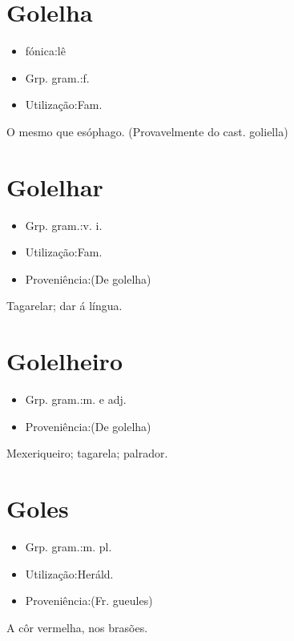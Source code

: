 \section{Golelha}
\begin{itemize}
\item {fónica:lê}
\end{itemize}
\begin{itemize}
\item {Grp. gram.:f.}
\end{itemize}
\begin{itemize}
\item {Utilização:Fam.}
\end{itemize}
O mesmo que \textunderscore esóphago\textunderscore .
(Provavelmente do cast. \textunderscore goliella\textunderscore )
\section{Golelhar}
\begin{itemize}
\item {Grp. gram.:v. i.}
\end{itemize}
\begin{itemize}
\item {Utilização:Fam.}
\end{itemize}
\begin{itemize}
\item {Proveniência:(De \textunderscore golelha\textunderscore )}
\end{itemize}
Tagarelar; dar á língua.
\section{Golelheiro}
\begin{itemize}
\item {Grp. gram.:m.  e  adj.}
\end{itemize}
\begin{itemize}
\item {Proveniência:(De \textunderscore golelha\textunderscore )}
\end{itemize}
Mexeriqueiro; tagarela; palrador.
\section{Goles}
\begin{itemize}
\item {Grp. gram.:m. pl.}
\end{itemize}
\begin{itemize}
\item {Utilização:Heráld.}
\end{itemize}
\begin{itemize}
\item {Proveniência:(Fr. \textunderscore gueules\textunderscore )}
\end{itemize}
A côr vermelha, nos brasões.
